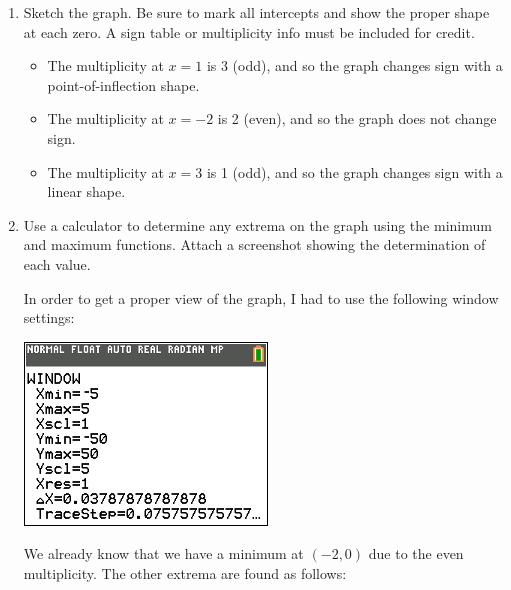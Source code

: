 \documentclass[letterpaper,12pt,fleqn]{article}
\begin{document}
\begin{enumerate}
\begin{enumerate}
  \item Sketch the graph. Be sure to mark all intercepts and show the proper
    shape at each zero. A sign table or multiplicity info must be included for
    credit.

    \begin{itemize}
    \item The multiplicity at $x=1$ is 3 (odd), and so the graph changes sign
      with a point-of-inflection shape.
    \item The multiplicity at $x=-2$ is 2 (even), and so the graph does not
      change sign.
    \item The multiplicity at $x=3$ is 1 (odd), and so the graph changes sign
      with a linear shape.
    \end{itemize}

    
  \item Use a calculator to determine any extrema on the graph using the
    minimum and maximum functions. Attach a screenshot showing the
    determination of each value.

    In order to get a proper view of the graph, I had to use the following
    window settings:

    \includegraphics{hw12-2-1}

    We already know that we have a minimum at $(-2,0)$ due to the even
    multiplicity. The other extrema are found as follows:
    

\end{enumerate}
\end{enumerate}
\end{document}
